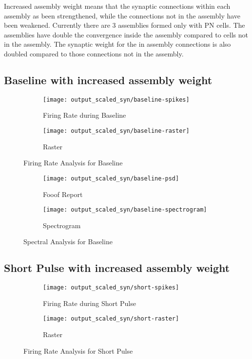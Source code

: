 \documentclass[12pt, letterpaper]{article}
\begin{document}
Increased assembly weight means that the synaptic connections within each assembly as been strengthened, while the connections not in the assembly have been weakened.
Currently there are 3 assemblies formed only with PN cells. The assemblies have double the convergence inside the assembly compared to cells not in the assembly.
The synaptic weight for the in assembly connections is also doubled compared to those connections not in the assembly.

\subsection*{Baseline with increased assembly weight}

\begin{figure}[H]
  \centering
  \begin{subfigure}{\textwidth}
    \centering
    \texttt{[image: output\_scaled\_syn/baseline-spikes]}
    \caption{Firing Rate during Baseline}
    \label{fig:baseline-spikes}
  \end{subfigure}
  \begin{subfigure}{\textwidth}
    \centering
    \texttt{[image: output\_scaled\_syn/baseline-raster]}
    \caption{Raster}
    \label{fig:baseline-raster}
  \end{subfigure}
  \caption{Firing Rate Analysis for Baseline}
\end{figure}

\begin{figure}[H]
    \centering
    \begin{subfigure}{.75\textwidth}
      \centering
      \texttt{[image: output\_scaled\_syn/baseline-psd]}
      \caption{Fooof Report}
      \label{fig:baseline-psd}
    \end{subfigure}
    \begin{subfigure}{.75\textwidth}
      \centering
      \texttt{[image: output\_scaled\_syn/baseline-spectrogram]}
      \caption{Spectrogram}
      \label{fig:baseline-spectrogram}
    \end{subfigure}
    \caption{Spectral Analysis for Baseline}
\end{figure}

\subsection*{Short Pulse with increased assembly weight}

\begin{figure}[H]
  \centering
  \begin{subfigure}{\textwidth}
    \centering
    \texttt{[image: output\_scaled\_syn/short-spikes]}
    \caption{Firing Rate during Short Pulse}
    \label{fig:short-spikes}
  \end{subfigure}
  \begin{subfigure}{\textwidth}
    \centering
    \texttt{[image: output\_scaled\_syn/short-raster]}
    \caption{Raster}
    \label{fig:short-raster}
  \end{subfigure}
  \caption{Firing Rate Analysis for Short Pulse}
\end{figure}
\end{document}
